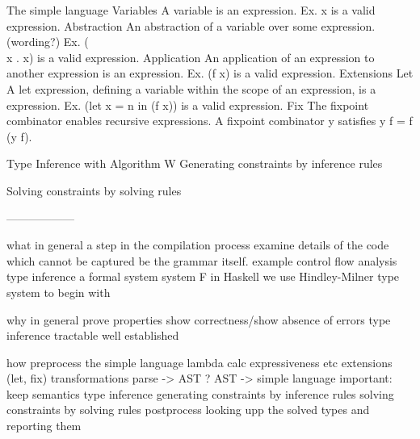   The simple language
    Variables
      A variable is an expression.
      Ex. x is a valid expression.
    Abstraction
      An abstraction of a variable over some expression. (wording?)
      Ex. (\\x . x) is a valid expression. 
    Application
      An application of an expression to another expression is an expression.
      Ex. (f x) is a valid expression.
    Extensions
      Let
        A let expression, defining a variable within the scope of an expression, is a expression.
        Ex. (let x = n in (f x)) is a valid expression. 
      Fix
        The fixpoint combinator enables recursive expressions. A fixpoint combinator y satisfies y f = f (y f).
  

  Type Inference with Algorithm W
    Generating constraints by inference rules

    Solving constraints by solving rules









------------------

what
  in general
    a step in the compilation process
    examine details of the code which cannot be captured be the grammar itself.
    example control flow analysis
  type inference
    a formal system
    system F in Haskell
    we use Hindley-Milner type system to begin with

why
  in general
    prove properties
    show correctness/show absence of errors
  type inference
    tractable
    well established

how
  preprocess
    the simple language
      lambda calc
        expressiveness etc
        extensions (let, fix)
    transformations
      parse -> AST ?
      AST -> simple language
      important: keep semantics
  type inference
    generating constraints by inference rules
    solving constraints by solving rules
  postprocess
    looking upp the solved types and reporting them
